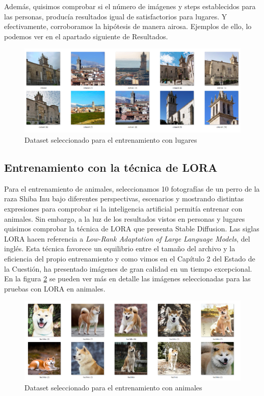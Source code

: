 Además, quisimos comprobar si el número de imágenes y steps establecidos para las personas, producía resultados igual de satisfactorios para lugares. Y efectivamente, corroboramos la hipótesis de manera airosa. Ejemplos de ello, lo podemos ver en el apartado siguiente de Resultados.  

\begin{figure}[!htb]
	\centering
	\includegraphics[width = 0.7
	\textwidth]{Imagenes/Vectorial/dataset_colmenar.png}
	\caption{Dataset seleccionado para el entrenamiento con lugares}
	\label{fig:datasetcolme}
\end{figure}


\subsection{Entrenamiento con la técnica de LORA}

Para el entrenamiento de animales, seleccionamos 10 fotografías de un perro de la raza Shiba Inu bajo diferentes perspectivas, escenarios y mostrando distintas expresiones para comprobar si la inteligencia artificial permitía entrenar con animales. Sin embargo, a la luz de los resultados vistos en personas y lugares quisimos comprobar la técnica de LORA que presenta Stable Diffusion. Las siglas LORA hacen referencia a \textit{Low-Rank Adaptation of Large Language Models}, del inglés. Esta técnica favorece un equilibrio entre el tamaño del archivo y la eficiencia del propio entrenamiento y como vimos en el Capítulo 2 del Estado de la Cuestión, ha presentado imágenes de gran calidad en un tiempo excepcional. En la figura \ref{fig:datasethachi} se pueden ver más en detalle las imágenes seleccionadas para las pruebas con LORA en animales.

\begin{figure}[h]
	\centering
	\includegraphics[width = 1
	\textwidth]{Imagenes/Vectorial/dataset_hachiko.png}
	\caption{Dataset seleccionado para el entrenamiento con animales}
	\label{fig:datasethachi}
\end{figure}

